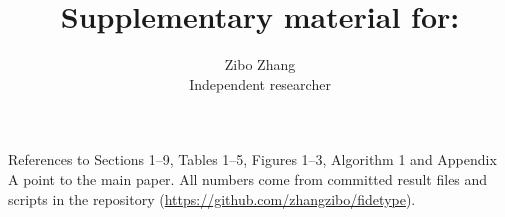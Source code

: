 \documentclass[11pt,a4paper]{article}
\title{Supplementary material for:\\[2pt] \papertitle}
\author{Zibo Zhang\\[2pt] \normalsize Independent researcher}
\date{}
\begin{document}
\maketitle
\noindent References to Sections 1--9, Tables 1--5, Figures 1--3, Algorithm 1 and Appendix A point to the main paper. All numbers come from committed result files and scripts in the repository (\url{https://github.com/zhangzibo/fidetype}).

\tableofcontents





\end{document}
